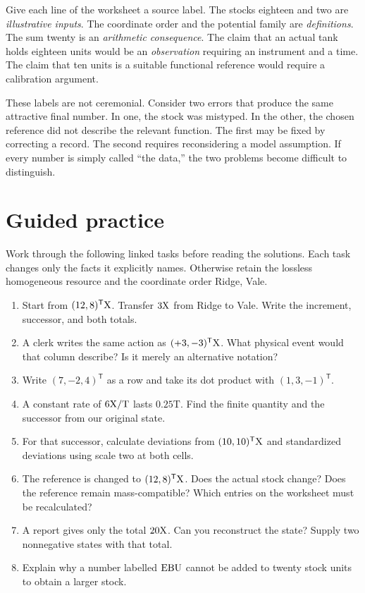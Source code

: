 Give each line of the worksheet a source label. The stocks eighteen and two are \emph{illustrative inputs}. The coordinate order and the potential family are \emph{definitions}. The sum twenty is an \emph{arithmetic consequence}. The claim that an actual tank holds eighteen units would be an \emph{observation} requiring an instrument and a time. The claim that ten units is a suitable functional reference would require a calibration argument.

These labels are not ceremonial. Consider two errors that produce the same attractive final number. In one, the stock was mistyped. In the other, the chosen reference did not describe the relevant function. The first may be fixed by correcting a record. The second requires reconsidering a model assumption. If every number is simply called ``the data,'' the two problems become difficult to distinguish.

\section{Guided practice}

Work through the following linked tasks before reading the solutions. Each task changes only the facts it explicitly names. Otherwise retain the lossless homogeneous resource and the coordinate order Ridge, Vale.

\begin{enumerate}
\item Start from \((12,8)^{\mathsf T}\mathrm{X}\). Transfer \(3\mathrm{X}\) from Ridge to Vale. Write the increment, successor, and both totals.
\item A clerk writes the same action as \((+3,-3)^{\mathsf T}\mathrm{X}\). What physical event would that column describe? Is it merely an alternative notation?
\item Write \((7,-2,4)^{\mathsf T}\) as a row and take its dot product with \((1,3,-1)^{\mathsf T}\).
\item A constant rate of \(6\mathrm{X}/\mathrm{T}\) lasts \(0.25\mathrm{T}\). Find the finite quantity and the successor from our original state.
\item For that successor, calculate deviations from \((10,10)^{\mathsf T}\mathrm{X}\) and standardized deviations using scale two at both cells.
\item The reference is changed to \((12,8)^{\mathsf T}\mathrm{X}\). Does the actual stock change? Does the reference remain mass-compatible? Which entries on the worksheet must be recalculated?
\item A report gives only the total \(20\mathrm{X}\). Can you reconstruct the state? Supply two nonnegative states with that total.
\item Explain why a number labelled \(\mathrm{EBU}\) cannot be added to twenty stock units to obtain a larger stock.
\end{enumerate}


